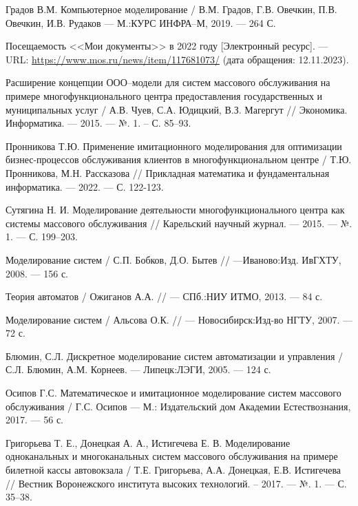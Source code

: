 
\renewcommand\bibname{СПИСОК ИСПОЛЬЗОВАННЫХ ИСТОЧНИКОВ}
\begin{thebibliography}{}
	
\setlength\bibindent{1.25cm}
\makeatletter
\let\old@biblabel\@biblabel
\def\@biblabel#1{\kern\bibindent\old@biblabel{#1}}
\makeatother

 Градов В.М. Компьютерное моделирование / В.М. Градов, Г.В. Овечкин, П.В. Овечкин, И.В. Рудаков --- М.:КУРС ИНФРА--М, 2019. --- 264 С. 

 Посещаемость <<Мои документы>> в 2022 году [Электронный ресурс]. --- URL: \url{https://www.mos.ru/news/item/117681073/} (дата обращения: 12.11.2023).

  Расширение концепции ООО--модели для систем массового обслуживания на примере многофункционального центра предоставления государственных и муниципальных услуг / А.В. Чуев, С.А. Юдицкий, В.З. Магергут // Экономика. Информатика. --- 2015. --- №. 1. – С. 85--93.

 Пронникова Т.Ю. Применение имитационного моделирования для оптимизации бизнес-процессов обслуживания клиентов в многофункциональном центре / Т.Ю. Пронникова, М.Н. Рассказова // Прикладная математика и фундаментальная информатика. --- 2022. --- С. 122-123.

 Сутягина Н. И. Моделирование деятельности многофункционального центра как системы массового обслуживания // Карельский научный журнал. --- 2015. --- №. 1. --- С. 199--203.

 Моделирование систем / С.П. Бобков, Д.О. Бытев // ---Иваново:Изд. ИвГХТУ, 2008. --- 156 с. 

 Теория автоматов / Ожиганов А.А. // --- СПб.:НИУ ИТМО, 2013. --- 84 с. 

 Моделирование систем / Альсова О.К. // --- Новосибирск:Изд-во НГТУ, 2007. --- 72 с.

 Блюмин, С.Л. Дискретное моделирование систем автоматизации и управления / С.Л. Блюмин, А.М. Корнеев. --- Липецк:ЛЭГИ, 2005. --- 124 с.

 Осипов Г.С. Математическое и имитационное моделирование систем массового
обслуживания / Г.С. Осипов --- М.: Издательский дом Академии Естествознания, 2017. --- 56 с.

 Григорьева Т. Е., Донецкая А. А., Истигечева Е. В. Моделирование одноканальных и многоканальных систем массового обслуживания на примере билетной кассы автовокзала / Т.Е. Григорьева, А.А. Донецкая, Е.В. Истигечева  // Вестник Воронежского института высоких технологий. -- 2017. --- №. 1. --- С. 35--38.


\end{thebibliography}

